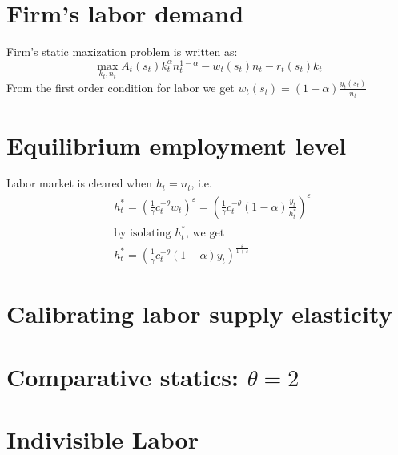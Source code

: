 \documentclass[12pt]{amsart}
\begin{document}
\section{Firm's labor demand}
Firm's static maxization problem is written as: 
\begin{equation*}
\max_{k_t, n_t} A_t(s_t) k_t^\alpha n_t^{1-\alpha} - w_t(s_t) n_t - r_t(s_t) k_t
\end{equation*}
From the first order condition for labor we get $w_t(s_t) = (1-\alpha) \frac{y_t(s_t)}{n_t}$
\section{Equilibrium employment level}
Labor market is cleared when $h_t = n_t$, i.e. 
\begin{align*}
&h_t^{*} = \left( \frac{1}{\gamma} c_t^{-\theta} w_t \right)^\varepsilon = \left( \frac{1}{\gamma} c_t^{-\theta} (1-\alpha) \frac{y_t}{h_t^{*}} \right)^\varepsilon \\
&\text{by isolating $h_t^{*}$, we get} \\
&h_t^{*} = \left(  \frac{1}{\gamma} c_t^{-\theta} (1-\alpha) y_t  \right)^{\frac{\varepsilon}{1+\varepsilon}}
\end{align*}

\section{Calibrating labor supply elasticity}
\section{Comparative statics: $\theta = 2$}
\section{Indivisible Labor}
\end{document}
